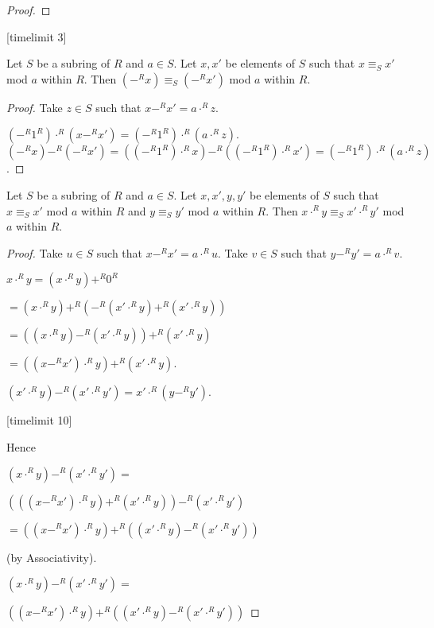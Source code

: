 \documentclass[english,11pt]{article}
\begin{document}
\begin{forthel}
\begin{proof}
\end{proof}
[timelimit 3]

\begin{lemma}
Let $S$ be a subring of $R$ and $a \in S$.
Let $x,x'$ be elements of $S$ such that
$x \equiv_{S} x'$ mod $a$ within $R$. 
Then $(-^{R}x) \equiv_{S} (-^{R}x')$ mod $a$ within $R$.
\end{lemma}
\begin{proof}
Take $z \in S$ such that $x -^{R} x' = a \cdot^{R} z$.

$(-^{R} 1^{R}) \cdot^{R} (x -^{R} x') = (-^{R} 1^{R}) \cdot^{R} (a \cdot^{R} z)$.
$(-^{R}x) -^{R} (-^{R}x') =
((-^{R} 1^{R}) \cdot^{R} x) -^{R} ((-^{R} 1^{R}) \cdot^{R} x') =
(-^{R} 1^{R}) \cdot^{R} (a \cdot^{R} z)$.
\end{proof}

\begin{lemma}
Let $S$ be a subring of $R$ and $a \in S$.
Let $x,x',y,y'$ be elements of $S$ such that
$x \equiv_{S} x'$ mod $a$ within $R$
and $y \equiv_{S} y'$ mod $a$ within $R$. 
Then $x \cdot^{R} y \equiv_{S} x' \cdot^{R} y'$ mod $a$ within $R$.
\end{lemma}
\begin{proof}
Take $u \in S$ such that $x -^{R} x' = a \cdot^{R} u$.
Take $v \in S$ such that $y -^{R} y' = a \cdot^{R} v$.

$x \cdot^{R} y = (x \cdot^{R} y) +^{R} 0^{R}$

$= (x \cdot^{R} y) +^{R} (-^{R} (x' \cdot^{R} y) +^{R} (x' \cdot^{R} y))$

$= ((x \cdot^{R} y) -^{R} (x' \cdot^{R} y)) +^{R} (x' \cdot^{R} y)$

$= ((x -^{R} x') \cdot^{R} y) +^{R} (x' \cdot^{R} y)$.


$(x' \cdot^{R} y) -^{R} (x' \cdot^{R} y') = x' \cdot^{R} (y -^{R} y')$.

[timelimit 10]

Hence

$(x \cdot^{R} y) -^{R} (x' \cdot^{R} y') = $
 
$ (((x -^{R} x') \cdot^{R} y) +^{R} (x' \cdot^{R} y)) -^{R} (x' \cdot^{R} y')$ 

$ = ((x -^{R} x') \cdot^{R} y) +^{R} ((x' \cdot^{R} y) -^{R} (x' \cdot^{R} y'))$

(by Associativity).

$(x \cdot^{R} y) -^{R} (x' \cdot^{R} y') = $

$((x -^{R} x') \cdot^{R} y) +^{R} ((x' \cdot^{R} y) -^{R} (x' \cdot^{R} y'))$ 


\end{proof}
\end{forthel}
\end{document}
